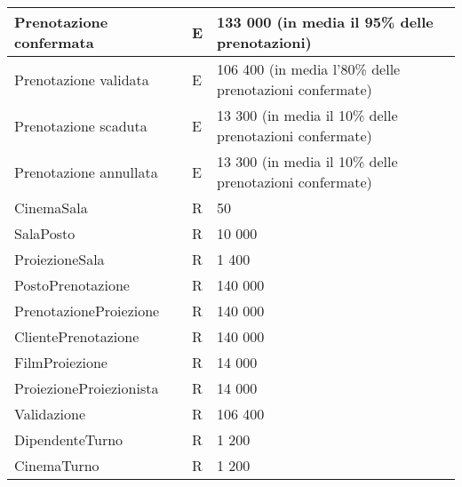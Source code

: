 \begin{tabularx}{\linewidth}{|X|l|X|}
    Prenotazione confermata
     & E
     & 133 000 (in media il 95\% delle prenotazioni)
    \\ \hline
    Prenotazione validata
     & E
     & 106 400 (in media l'80\% delle prenotazioni confermate)
    \\ \hline
    Prenotazione scaduta
     & E
     & 13 300 (in media il 10\% delle prenotazioni confermate)
    \\ \hline
    Prenotazione annullata
     & E
     & 13 300 (in media il 10\% delle prenotazioni confermate)
    \\ \hline
    CinemaSala
     & R
     & 50
    \\ \hline
    SalaPosto
     & R
     & 10 000
    \\ \hline
    ProiezioneSala
     & R
     & 1 400
    \\ \hline
    PostoPrenotazione
     & R
     & 140 000
    \\ \hline
    PrenotazioneProiezione
     & R
     & 140 000
    \\ \hline
    ClientePrenotazione
     & R
     & 140 000
    \\ \hline
    FilmProiezione
     & R
     & 14 000
    \\ \hline
    ProiezioneProiezionista
     & R
     & 14 000
    \\ \hline
    Validazione
     & R
     & 106 400
    \\ \hline
    DipendenteTurno
     & R
     & 1 200
    \\ \hline
    CinemaTurno
     & R
     & 1 200
    \\ \hline
\end{tabularx}

